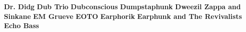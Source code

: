 \vspace{10pt} 
\noindent \textbf{Dr. Didg}\newline
\vspace{10pt} 
\newline
\vspace{10pt} 
\noindent \textbf{Dub Trio}\newline
\vspace{10pt} 
\newline
\vspace{10pt} 
\noindent \textbf{Dubconscious}\newline
\vspace{10pt} 
\newline
\vspace{10pt} 
\noindent \textbf{Dumpstaphunk}\newline
\vspace{10pt} 
\newline
\vspace{10pt} 
\noindent \textbf{Dweezil Zappa and Sinkane}\newline
\vspace{10pt} 
\newline
\vspace{10pt} 
\noindent \textbf{EM Grueve}\newline
\vspace{10pt} 
\newline
\vspace{10pt} 
\noindent \textbf{EOTO}\newline
\vspace{10pt} 
\newline
\vspace{10pt} 
\noindent \textbf{Earphorik}\newline
\vspace{10pt} 
\newline
\vspace{10pt} 
\noindent \textbf{Earphunk and The Revivalists}\newline
\vspace{10pt} 
\newline
\vspace{10pt} 
\noindent \textbf{Echo Bass}\newline
\vspace{10pt} 

